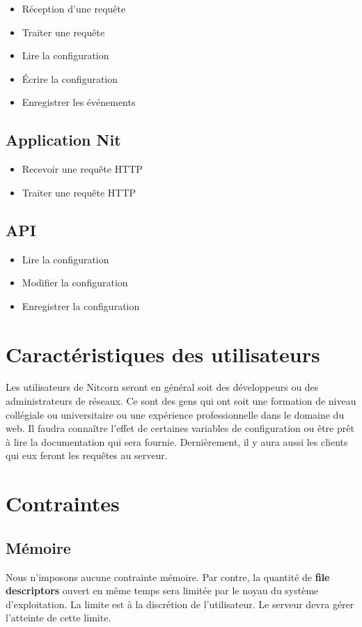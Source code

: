 \documentclass{scrreprt}
\begin{document}
\begin{itemize}
 \item Réception d'une requête
 \item Traiter une requête
 \item Lire la configuration
 \item Écrire la configuration
 \item Enregistrer les événements
\end{itemize}
\subsection{Application Nit}
\begin{itemize}
 \item Recevoir une requête HTTP
 \item Traiter une requête HTTP
\end{itemize}
\subsection{API}
\begin{itemize}
 \item Lire la configuration
 \item Modifier la configuration
 \item Enregistrer la configuration
\end{itemize}
\section{Caractéristiques des utilisateurs}
Les utilisateurs de Nitcorn seront en général soit des développeurs ou des
administrateurs de réseaux. Ce sont des gens qui ont soit une formation de
niveau collégiale ou universitaire ou une expérience professionnelle dans
le domaine du web. Il faudra connaître l'effet de certaines variables de
configuration ou être prêt à lire la documentation qui sera fournie.
Dernièrement, il y aura aussi les clients qui eux feront les requêtes
au serveur.
\section{Contraintes}

\subsection{Mémoire}
Nous n'imposons aucune contrainte mémoire. Par contre, la quantité de
\textbf{file descriptors} ouvert en même temps sera limitée par le noyau du
système d'exploitation. La limite est à la discrétion de l'utilisateur. Le
serveur devra gérer l'atteinte de cette limite.
\end{document}
